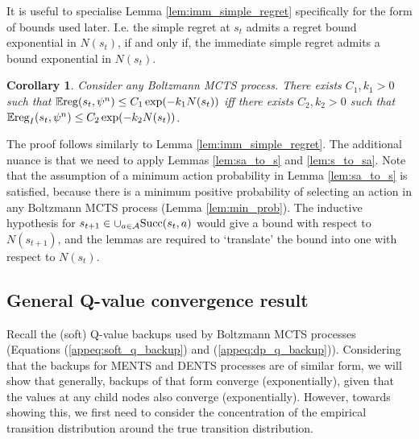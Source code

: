 \documentclass{article}
\newcommand{\bb}[1]{\mathbb{#1}}
\newcommand{\cl}[1]{\mathcal{#1}}
\newcommand{\suc}[1]{\cup_{a\in\cl{A}}\textnormal{Succ}(#1,a)}
\newcommand{\reg}{\textnormal{reg}}
\theoremstyle{plain}
\newtheorem{corollary}{Corollary}[theorem]
\newenvironment{proofoutline}{\proof[Proof outline]}{\endproof}
\begin{document}
\begin{appendices}
    
        It is useful to specialise Lemma \ref{lem:imm_simple_regret} specifically for the form of bounds used later. I.e. the simple regret at $s_t$ admits a regret bound exponential in $N(s_t)$, if and only if, the immediate simple regret admits a bound exponential in $N(s_t)$.
        
        \begin{corollary} \label{cor:imm_to_full_simple_regret}
            Consider any Boltzmann MCTS process. There exists $C_1,k_1>0$ such that $\bb{E}\reg(s_t,\psi^n) \leq C_1\exp(-k_1 N(s_t))$ iff there exists $C_2,k_2>0$ such that $\bb{E}\reg_I(s_t,\psi^n) \leq C_2\exp(-k_2 N(s_t))$.
        \end{corollary}
        \begin{proofoutline}
            The proof follows similarly to Lemma \ref{lem:imm_simple_regret}. The additional nuance is that we need to apply Lemmas \ref{lem:sa_to_s} and \ref{lem:s_to_sa}. Note that the assumption of a minimum action probability in Lemma \ref{lem:sa_to_s} is satisfied, because there is a minimum positive probability of selecting an action in any Boltzmann MCTS process (Lemma \ref{lem:min_prob}). The inductive hypothesis for $s_{t+1}\in\suc{s_t}$ would give a bound with respect to $N(s_{t+1})$, and the lemmas are required to `translate' the bound into one with respect to $N(s_t)$.
        \end{proofoutline}
    




    
    
    
    \subsection{General Q-value convergence result} \label{app:q_result}
        
    
        Recall the (soft) Q-value backups used by Boltzmann MCTS processes (Equations (\ref{appeq:soft_q_backup}) and (\ref{appeq:dp_q_backup})). Considering that the backups for MENTS and DENTS processes are of similar form, we will show that generally, backups of that form converge (exponentially), given that the values at any child nodes also converge (exponentially). However, towards showing this, we first need to consider the concentration of the empirical transition distribution around the true transition distribution.







\end{appendices}
\end{document}

